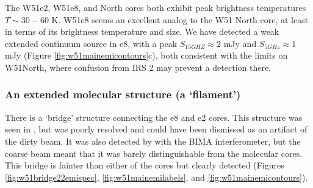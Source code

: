 
The W51e2, W51e8, and North cores both exhibit peak brightness temperatures
$T\sim30-60$ K.  W51e8 seems an excellent analog to the W51 North core, at
least in terms of its brightness temperature and size.  We have detected a weak
extended continuum source in e8, with a peak $S_{15 GHZ} \approx 2$ mJy and
$S_{5 GHz} \approx 1$ mJy (Figure \ref{fig:w51mainemicontours}c), both
consistent with the limits on W51North, where confusion from IRS 2 may prevent
a detection there.

\subsubsection{An extended molecular structure (a `filament')}
\label{sec:bridgefilament}
There is a `bridge' structure connecting the e8 and e2 cores.  This structure
was seen in \citet{Zhang1997a}, but was poorly resolved and could have been
dismissed as an artifact of the dirty beam.  It was also detected by
\citet{Tang2009a} with the BIMA interferometer, but the coarse beam meant that
it was barely distinguishable from the molecular cores.  This bridge is fainter
than either of the cores but clearly detected (Figures
\ref{fig:w51bridge22emispec}, \ref{fig:w51mainemilabels}, and
\ref{fig:w51mainemicontours}).




